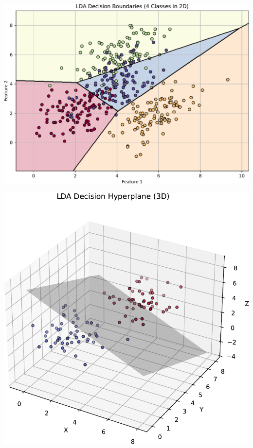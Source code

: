 \begin{examplebox}
    \begin{center}
        \captionsetup{type=figure}
        \includegraphics[width=\textwidth]{img/lda/lda-2d-4-classes.pdf}
    \end{center}

    \begin{center}
        \captionsetup{type=figure}
        \includegraphics[width=\textwidth]{img/lda/lda-3d.pdf}
    \end{center}
\end{examplebox}